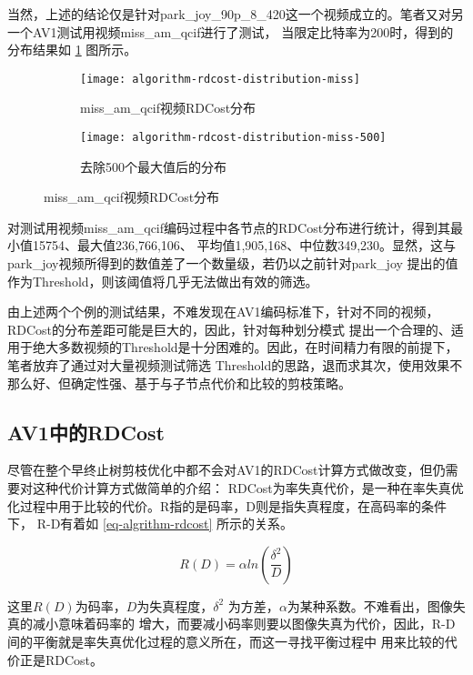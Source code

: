 当然，上述的结论仅是针对park\_joy\_90p\_8\_420这一个视频成立的。笔者又对另一个AV1测试用视频miss\_am\_qcif进行了测试，
当限定比特率为200时，得到的分布结果如 \ref{fig:algorithm-rdcost-distribution-miss} 图所示。

\begin{figure}[H]
  \centering%
  \begin{subfigure}{0.43\textwidth}
    \centering
    \texttt{[image: algorithm-rdcost-distribution-miss]}
    \caption{miss\_am\_qcif视频RDCost分布}
  \end{subfigure}%
  \hspace{2em}%
  \begin{subfigure}{0.43\textwidth}
    \centering
    \texttt{[image: algorithm-rdcost-distribution-miss-500]}
    \caption{去除500个最大值后的分布}
  \end{subfigure}
  \caption{miss\_am\_qcif视频RDCost分布}
  \label{fig:algorithm-rdcost-distribution-miss}
\end{figure}

对测试用视频miss\_am\_qcif编码过程中各节点的RDCost分布进行统计，得到其最小值15754、最大值236,766,106、
平均值1,905,168、中位数349,230。显然，这与park\_joy视频所得到的数值差了一个数量级，若仍以之前针对park\_joy
提出的值作为Threshold，则该阈值将几乎无法做出有效的筛选。

由上述两个个例的测试结果，不难发现在AV1编码标准下，针对不同的视频，RDCost的分布差距可能是巨大的，因此，针对每种划分模式
提出一个合理的、适用于绝大多数视频的Threshold是十分困难的。因此，在时间精力有限的前提下，笔者放弃了通过对大量视频测试筛选
Threshold的思路，退而求其次，使用效果不那么好、但确定性强、基于与子节点代价和比较的剪枝策略。

\subsection{AV1中的RDCost}

尽管在整个早终止树剪枝优化中都不会对AV1的RDCost计算方式做改变，但仍需要对这种代价计算方式做简单的介绍：
RDCost为率失真代价，是一种在率失真优化过程中用于比较的代价。R指的是码率，D则是指失真程度，在高码率的条件下，
R-D有着如 \ref{eq-algrithm-rdcost} 所示的关系。

\begin{equation}
\label{eq-algrithm-rdcost}
R(D) = \alpha ln(\frac{\delta^2}{D})
\end{equation}

这里$R(D)$为码率，$D$为失真程度，$\delta^2$ 为方差，$\alpha$为某种系数。不难看出，图像失真的减小意味着码率的
增大，而要减小码率则要以图像失真为代价，因此，R-D间的平衡就是率失真优化过程的意义所在，而这一寻找平衡过程中
用来比较的代价正是RDCost。

